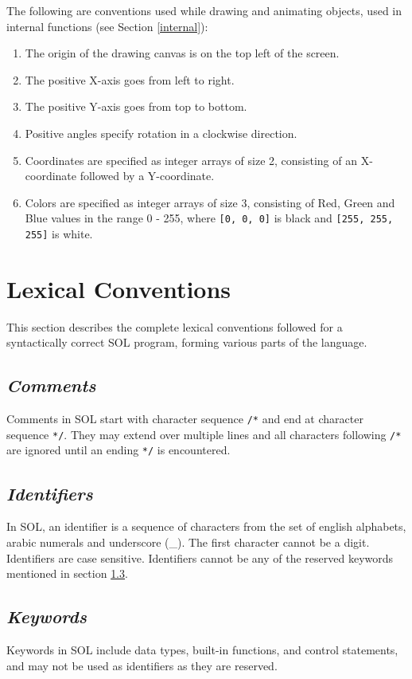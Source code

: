 \documentclass[letterpaper,12pt]{article}
\begin{document}
The following are conventions used while drawing and animating objects, used in internal functions (see Section \ref{internal}):

	\begin{enumerate}
		\itemsep0em
		\item The origin of the drawing canvas is on the top left of the screen.
		\item The positive X-axis goes from left to right.
		\item The positive Y-axis goes from top to bottom.
		\item Positive angles specify rotation in a clockwise direction.
		\item Coordinates are specified as integer arrays of size 2, consisting of an X-coordinate followed by a Y-coordinate.
		\item Colors are specified as integer arrays of size 3, consisting of Red, Green and Blue values in the range 0 - 255, where \texttt{[0, 0, 0]} is black and \texttt{[255, 255, 255]} is white.
	\end{enumerate}

\section{Lexical Conventions}

This section describes the complete lexical conventions followed for a syntactically correct SOL program, forming various parts of the language.

    \subsection{\textit{Comments}}
    Comments in SOL start with character sequence \texttt{/*} and end at character sequence \texttt{*/}. They may extend over multiple lines and all characters following \texttt{/*} are ignored until an ending \texttt{*/} is encountered.

    \subsection{\textit{Identifiers}}
    In SOL, an identifier is a sequence of characters from the set of english alphabets, arabic numerals and underscore (\_). The first character cannot be a digit. Identifiers are case sensitive. Identifiers cannot be any of the reserved keywords mentioned in section \ref{keywords}.

    \subsection{\textit{Keywords}} \label{keywords}
    Keywords in SOL include data types, built-in functions, and control statements, and may not be used as identifiers as they are reserved.
\end{document}
